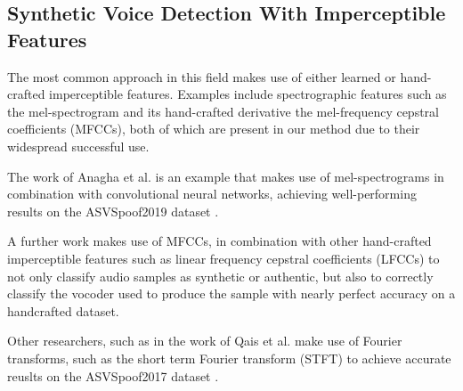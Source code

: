 \documentclass{article}
\begin{document}
	\subsection{Synthetic Voice Detection With Imperceptible Features}
	The most common approach in this field makes use of either learned or hand-crafted
	imperceptible features. Examples include spectrographic features such as the mel-spectrogram
	and its hand-crafted derivative the mel-frequency cepstral coefficients (MFCCs), both of which
	are present in our method due to their widespread successful use.
	\par
	The work of Anagha et al. \cite{anagha_audio_2023} is an example that makes use of
	mel-spectrograms in combination with convolutional neural networks, achieving well-performing
	results on the ASVSpoof2019 dataset \cite{wang_asvspoof_2020}.
	\par
	\sloppy
	A further work \cite{yan_initial_2022} makes use of MFCCs, in combination with other
	hand-crafted imperceptible features such as linear frequency cepstral coefficients (LFCCs) to
	not only classify audio samples as synthetic or authentic, but also to correctly classify the
	vocoder used to produce the sample with nearly perfect accuracy on a handcrafted dataset.
	\par
	Other researchers, such as in the work of Qais et al. \cite{qais_deepfake_2022} make use of
	Fourier transforms, such as the short term Fourier transform (STFT) to achieve accurate
	reuslts on the ASVSpoof2017 dataset \cite{delgado_asvspoof_2018}.
\end{document}
